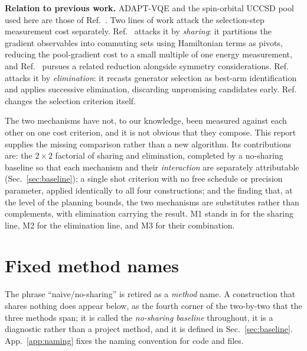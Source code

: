 \documentclass[10pt]{article}
\begin{document}
\textbf{Relation to previous work.} ADAPT-VQE and the spin-orbital UCCSD pool used here are those of Ref.~\cite{Grimsley2019ADAPT}. Two lines of work attack the selection-step measurement cost separately. Ref.~\cite{Anastasiou2023ReallyMeasure} attacks it by \emph{sharing}: it partitions the gradient observables into commuting sets using Hamiltonian terms as pivots, reducing the pool-gradient cost to a small multiple of one energy measurement, and Ref.~\cite{Shkolnikov2023Avoiding} pursues a related reduction alongside symmetry considerations. Ref.~\cite{Huang2025QuantumGambling} attacks it by \emph{elimination}: it recasts generator selection as best-arm identification and applies successive elimination, discarding unpromising candidates early. Ref.~\cite{Rossi2026RSe} changes the selection criterion itself.

The two mechanisms have not, to our knowledge, been measured against each other on one cost criterion, and it is not obvious that they compose. This report supplies the missing comparison rather than a new algorithm. Its contributions are: the $2\times2$ factorial of sharing and elimination, completed by a no-sharing baseline so that each mechanism and their \emph{interaction} are separately attributable (Sec.~\ref{sec:baseline}); a single shot criterion with no free schedule or precision parameter, applied identically to all four constructions; and the finding that, at the level of the planning bounds, the two mechanisms are substitutes rather than complements, with elimination carrying the result. M1 stands in for the sharing line, M2 for the elimination line, and M3 for their combination.

\section{Fixed method names}

The phrase ``naive/no-sharing'' is retired as a \emph{method} name. A construction that shares nothing does appear below, as the fourth corner of the two-by-two that the three methods span; it is called the \emph{no-sharing baseline} throughout, it is a diagnostic rather than a project method, and it is defined in Sec.~\ref{sec:baseline}. App.~\ref{app:naming} fixes the naming convention for code and files.
\end{document}
